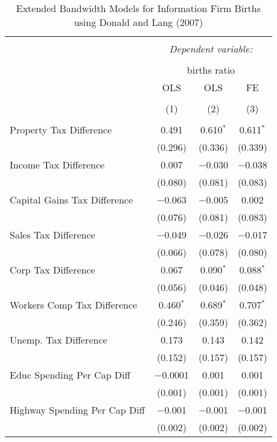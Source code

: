 
\begin{table}[!htbp] \centering 
  \caption{Extended Bandwidth Models for  Information Firm Births using Donald and Lang (2007)} 
  \label{} 
\begin{tabular}{@{\extracolsep{5pt}}lccc} 
\\[-1.8ex]\hline 
\hline \\[-1.8ex] 
 & \multicolumn{3}{c}{\textit{Dependent variable:}} \\ 
\cline{2-4} 
\\[-1.8ex] & \multicolumn{3}{c}{births ratio} \\ 
 & OLS & OLS & FE \\ 
\\[-1.8ex] & (1) & (2) & (3)\\ 
\hline \\[-1.8ex] 
 Property Tax Difference & 0.491 & 0.610$^{*}$ & 0.611$^{*}$ \\ 
  & (0.296) & (0.336) & (0.339) \\ 
  Income Tax Difference & 0.007 & $-$0.030 & $-$0.038 \\ 
  & (0.080) & (0.081) & (0.083) \\ 
  Capital Gains Tax Difference & $-$0.063 & $-$0.005 & 0.002 \\ 
  & (0.076) & (0.081) & (0.083) \\ 
  Sales Tax Difference & $-$0.049 & $-$0.026 & $-$0.017 \\ 
  & (0.066) & (0.078) & (0.080) \\ 
  Corp Tax Difference & 0.067 & 0.090$^{*}$ & 0.088$^{*}$ \\ 
  & (0.056) & (0.046) & (0.048) \\ 
  Workers Comp Tax Difference & 0.460$^{*}$ & 0.689$^{*}$ & 0.707$^{*}$ \\ 
  & (0.246) & (0.359) & (0.362) \\ 
  Unemp. Tax Difference & 0.173 & 0.143 & 0.142 \\ 
  & (0.152) & (0.157) & (0.157) \\ 
  Educ Spending Per Cap Diff & $-$0.0001 & 0.001 & 0.001 \\ 
  & (0.001) & (0.001) & (0.001) \\ 
  Highway Spending Per Cap Diff & $-$0.001 & $-$0.001 & $-$0.001 \\ 
  & (0.002) & (0.002) & (0.002) \\ 

\end{tabular}
\end{table}
